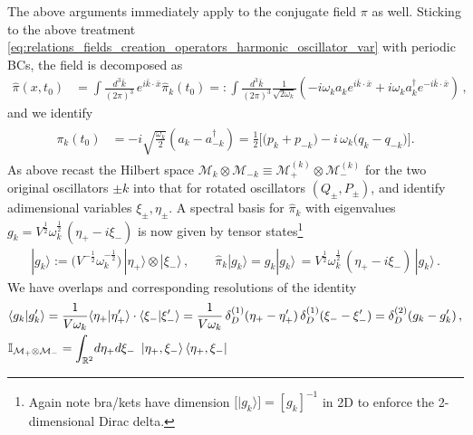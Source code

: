 \documentclass[../QFT_main.tex]{subfiles}
\begin{document}
\begin{mytheorem}
%
The above arguments immediately apply to the conjugate field $\pi$ as well.
Sticking to the above treatment \eqref{eq:relations_fields_creation_operators_harmonic_oscillator_var} with periodic BCs, the field is decomposed as
\begin{align}
    \hat{\pi}(x,t_0) &= \int \frac{d^3\bar{k}}{(2\pi)^3}\, e^{i\bar{k}\cdot\bar{x}} \hat{\pi}_k(t_0)
    = : \int \frac{d^3\bar{k}}{(2\pi)^3} \frac{1}{\sqrt{2\omega_k}} \left( -i \omega_k a_k e^{i \bar{k}\cdot\bar{x}} + i \omega_k a_k^{\dagger} e^{- i \bar{k}\cdot\bar{x}} \right)\,,
\end{align}
%
and we identify
\begin{align}
\begin{aligned}
    \pi_k(t_0) &= -i \sqrt{\frac{\omega_k}{2}} (a_k - a_{-k}^{\dagger}) 
    = \tfrac{1}{2}\Big[ \big({p}_k + {p}_{-k}\big) -i\,\omega_k\big({q}_k-{q}_{-k}\big)\Big].
\end{aligned}
\end{align}
%
As above recast the Hilbert space $\mathcal{M}_k\otimes \mathcal{M}_{-k} \equiv \mathcal{M}_+^{(k)} \otimes \mathcal{M}_-^{(k)}$ for the two original oscillators $\pm k$ into that for rotated oscillators $(Q_{\pm}, P_{\pm})$, and identify adimensional variables $\xi_{\pm}, \eta_{\pm}$.
A spectral basis for $\hat{\pi}_k$ with eigenvalues $g_k=V^{\frac{1}{2}} \omega_k^{\frac{1}{2}}\, ( \eta_+ - i \xi_-)$ is now given by tensor states\footnote{Again note bra/kets have dimension $\big[|g_k\rangle\big]=[g_k]^{-1}$ in 2D to enforce the 2-dimensional Dirac delta.}
\begin{align}
    |g_k\rangle := \Big(V^{-\frac{1}{2}}\omega_k^{-\frac{1}{2}}\Big)\, |\eta_+\rangle \otimes |\xi_-\rangle\,,\qquad
    \hat{\pi}_k |g_k\rangle = g_k |g_k\rangle\, = V^{\frac{1}{2}} \omega_k^{\frac{1}{2}}\, ( \eta_+ - i \xi_-)\, |g_k\rangle\,.
\end{align}
%
We have overlaps and corresponding resolutions of the identity
\begin{align}
    &\langle g_k | g_k' \rangle= \frac{1}{V\omega_k} \langle \eta_+ | \eta_+' \rangle \cdot \langle \xi_- | \xi_-' \rangle 
    = \frac{1}{V\omega_k} \,\delta^{(1)}_D(\eta_+ - \eta_+') \, \delta^{(1)}_D(\xi_- - \xi_-')
    = \delta^{(2)}_D(g_k - g_k')\,,
    \\
    &\mathbb{I}_{\mathcal{M}_+ \otimes \mathcal{M}_{-}} 
    = \int_{\R^2} \!d\eta_+ d\xi_-\,\,\, |\eta_+, \xi_- \rangle\, \langle \eta_+, \xi_- |

\end{align}
\end{mytheorem}
\end{document}
